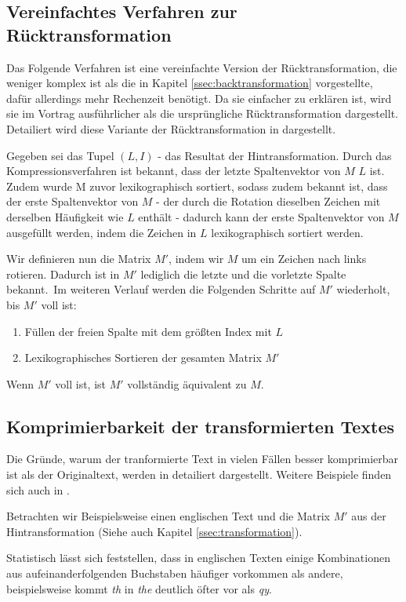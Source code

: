 \documentclass[ngerman,pdftex,paper=A4,DIV=calc,titlepage,12pt]{scrartcl}
\newtheorem[L]{boxedDefinition}{Definition}
\begin{document}
\subsection{Vereinfachtes Verfahren zur Rücktransformation}
Das Folgende Verfahren ist eine vereinfachte Version der Rücktransformation, die weniger komplex ist als die in Kapitel \vref{ssec:backtransformation} vorgestellte, dafür allerdings mehr Rechenzeit benötigt. Da sie einfacher zu erklären ist, wird sie im Vortrag ausführlicher als die ursprüngliche Rücktransformation dargestellt. Detailiert wird diese Variante der Rücktransformation in \cite{Wik2012-1} dargestellt.

Gegeben sei das Tupel $(L,I)$ - das Resultat der Hintransformation.
Durch das Kompressionsverfahren ist bekannt, dass der letzte Spaltenvektor von $M$ $L$ ist. Zudem wurde M zuvor lexikographisch sortiert, sodass zudem bekannt ist, dass der erste Spaltenvektor von $M$ - der durch die Rotation dieselben Zeichen mit derselben Häufigkeit wie $L$ enthält - dadurch kann der erste Spaltenvektor von $M$ ausgefüllt werden, indem die Zeichen in $L$ lexikographisch sortiert werden.

Wir definieren nun die Matrix $M'$, indem wir $M$ um ein Zeichen nach links rotieren. Dadurch ist in $M'$ lediglich die letzte und die vorletzte Spalte bekannt.\
\noindent Im weiteren Verlauf werden die Folgenden Schritte auf $M'$ wiederholt, bis $M'$ voll ist:
\begin{enumerate}
 \item Füllen der freien Spalte mit dem größten Index mit $L$
 \item Lexikographisches Sortieren der gesamten Matrix $M'$
\end{enumerate}
Wenn $M'$ voll ist, ist $M'$ vollständig äquivalent zu $M$.
\subsection{Komprimierbarkeit der transformierten Textes}
Die Gründe, warum der tranformierte Text in vielen Fällen besser komprimierbar ist als der Originaltext, werden in \cite{burrows1994block} detailiert dargestellt. Weitere Beispiele finden sich auch in \cite{Wik2012-1}.

Betrachten wir Beispielsweise einen englischen Text und die Matrix $M'$ aus der Hintransformation (Siehe auch Kapitel \vref{ssec:transformation}).

Statistisch lässt sich feststellen, dass in englischen Texten einige Kombinationen aus aufeinanderfolgenden Buchstaben häufiger vorkommen als andere, beispielsweise kommt \textit{th} in \textit{the} deutlich öfter vor als \textit{qy}.
\end{document}
